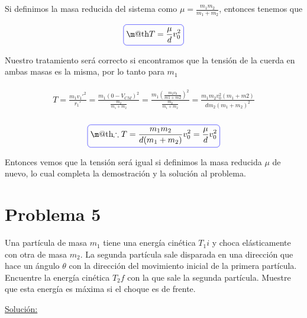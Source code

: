 \documentclass[a4paper,10pt]{article}
\makeatletter
\numberwithin{equation}{section}
\newcommand*{\boxcolor}{blue}
\renewcommand{\boxed}[1]{\textcolor{\boxcolor}{%
\tikz[baseline={([yshift=-1ex]current bounding box.center)}] \node [rectangle, minimum width=1ex,rounded corners,draw] {\normalcolor\m@th$\displaystyle#1$};}}
\makeatother
\begin{document}
Si definimos la masa reducida del sistema como $\mu = \frac{m_1 m_2}{m_1 + m_2}$, 
entonces tenemos que

\begin{equation}
 \boxed{T = \frac{\mu}{d} v_0^2}
 \label{eq:TensionM2}
\end{equation}

Nuestro tratamiento será correcto si encontramos que la tensión de la cuerda
en ambas masas es la misma, por lo tanto para $m_1$

\begin{align*}
\begin{split}
 T = \frac{m_1 v_1'^2}{r_1'} = \frac{m_1(0 - V_{CM})^2}{\frac{m_2}{m_1+m_2}} =
 \frac{m_1 (\frac{m_2 v_0}{m1+m2})^2}{\frac{m_2}{m_1+m_2}} =
 \frac{m_1 m_2 v_0^2 (m_1 + m2)}{d m_2 (m_1 + m_2)^2} \\
 \end{split}
\end{align*}

\begin{equation}
 \boxed{\therefore T = \frac{m_1 m_2}{d(m_1 + m_2)}v_0^2 = \frac{\mu}{d} v_0^2} %
\end{equation}

Entonces vemos que la tensión será igual si definimos la masa reducida $\mu$ de nuevo,
lo cual completa la demostración y la solución al problema.





\vspace{.3cm}

\section{Problema 5}

Una partícula de masa $m_1$ tiene una energía cinética $T_1i$ y choca elásticamente 
con otra de masa $m_2$. La segunda partícula sale disparada en una dirección que hace un
ángulo $\theta$ con la dirección del movimiento inicial de la primera partícula. Encuentre
la energía cinética $T_2f$ con la que sale la segunda partícula. Muestre que esta energía
es máxima si el choque es de frente.

\vspace{.3cm}

\underline{Solución:}

\vspace{.3cm}
\end{document}
